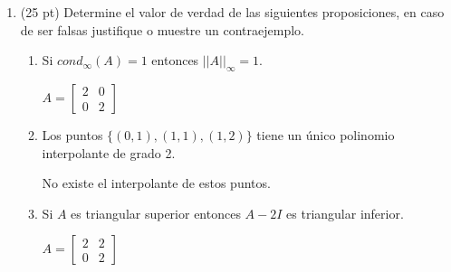 \documentclass[11pt]{article}
\begin{document}
 \begin{enumerate}
 \item (25 pt) Determine el valor de verdad de las siguientes proposiciones, en caso de ser falsas justifique o muestre un contraejemplo.
\begin{enumerate}
	\item {} 
    \begin{minipage}{0.4\textwidth}
		Si $cond_\infty(A)=1$ entonces $||A||_{\infty}=1$.
    \end{minipage} 
    \begin{minipage}{0.4\textwidth}
    $A=\begin{bmatrix} 2 & 0 \\ 0 & 2
    \end{bmatrix}$
    
    \end{minipage}
    \vspace{5mm}
    \item {} 
    \begin{minipage}{0.4\textwidth}
	Los puntos $\{(0,1),(1,1),(1,2)\}$ tiene un \'unico polinomio interpolante de grado 2.
    \end{minipage} 
    \begin{minipage}{0.4\textwidth}
	No existe el interpolante de estos puntos.
    
	\end{minipage}
       \vspace{5mm}
    \item {} 
    \begin{minipage}{0.4\textwidth}
	Si $A$ es triangular superior entonces $A-2I$ es triangular inferior.
    \end{minipage} 
    \begin{minipage}{0.4\textwidth}
	$A=\begin{bmatrix} 2 & 2 \\ 0 & 2\end{bmatrix}$
    

\end{minipage}
\end{enumerate}
\end{enumerate}
\end{document}
